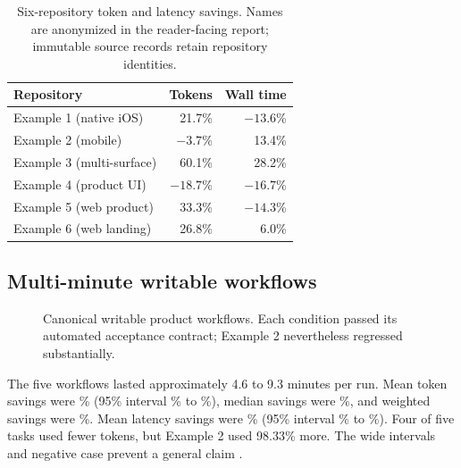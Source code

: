 \documentclass[10pt,twocolumn]{article}
\begin{document}
\begin{table}[t]
\centering
\caption{Six-repository token and latency savings. Names are anonymized in the
reader-facing report; immutable source records retain repository identities.}
\label{tab:sixrepo}
\scriptsize
\begin{tabular}{lrr}
\toprule
Repository & Tokens & Wall time \\
\midrule
Example 1 (native iOS) & 21.7\% & $-13.6$\% \\
Example 2 (mobile) & $-3.7$\% & 13.4\% \\
Example 3 (multi-surface) & 60.1\% & 28.2\% \\
Example 4 (product UI) & $-18.7$\% & $-16.7$\% \\
Example 5 (web product) & 33.3\% & $-14.3$\% \\
Example 6 (web landing) & 26.8\% & 6.0\% \\
\bottomrule
\end{tabular}
\end{table}

\subsection{Multi-minute writable workflows}

\begin{figure}[t]
\centering
{}
\caption{Canonical writable product workflows. Each condition passed its
automated acceptance contract; Example 2 nevertheless regressed substantially.}
\label{fig:workflow}
\end{figure}

The five workflows lasted approximately 4.6 to 9.3 minutes per run. Mean token
savings were \WorkflowMeanTokens\% (95\% interval \WorkflowTokenLower\% to
\WorkflowTokenUpper\%), median savings were \WorkflowMedianTokens\%, and
weighted savings were \WorkflowWeightedTokens\%. Mean latency savings were
\WorkflowMeanLatency\% (95\% interval \WorkflowLatencyLower\% to
\WorkflowLatencyUpper\%). Four of five tasks used fewer tokens, but Example 2
used 98.33\% more. The wide intervals and negative case prevent a general claim
\cite{memi2026workflow}.
\end{document}
